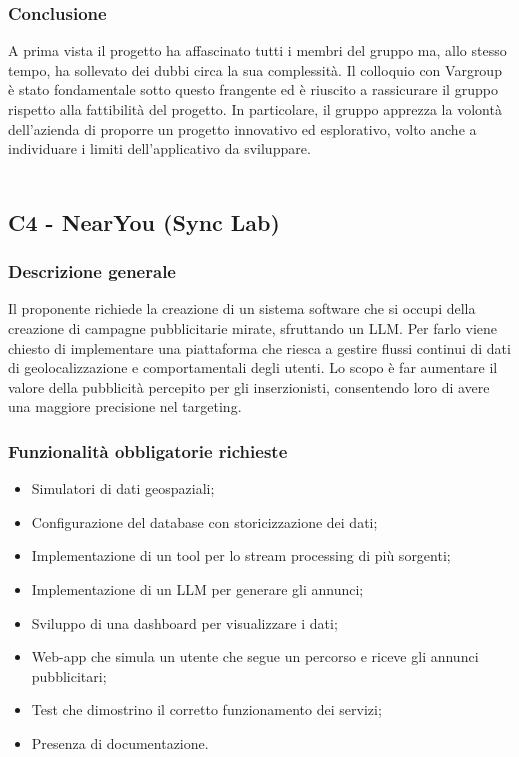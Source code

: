 \documentclass[10pt]{article}
\begin{document}
\subsubsection{Conclusione}
A prima vista il progetto ha affascinato tutti i membri del gruppo ma, allo stesso tempo, ha sollevato dei dubbi circa la sua complessità. Il colloquio con Vargroup è stato fondamentale sotto questo frangente ed è riuscito a rassicurare il gruppo rispetto alla fattibilità del progetto. In particolare, il gruppo apprezza la volontà dell’azienda di proporre un progetto innovativo ed esplorativo, volto anche a individuare i limiti dell’applicativo da sviluppare.
\\\\
\subsection{C4 - NearYou (Sync Lab)}
\subsubsection{Descrizione generale}
Il proponente richiede la creazione di un sistema software che si occupi della creazione di campagne pubblicitarie mirate, sfruttando un LLM. Per farlo viene chiesto di implementare una piattaforma che riesca a gestire flussi continui di dati di geolocalizzazione e comportamentali degli utenti. Lo scopo è far aumentare il valore della pubblicità percepito per gli inserzionisti, consentendo loro di avere una maggiore precisione nel targeting.
\subsubsection{Funzionalità obbligatorie richieste}
\begin{itemize}
    \item Simulatori di dati geospaziali;
    \item Configurazione del database con storicizzazione dei dati;
    \item Implementazione di un tool per lo stream processing di più sorgenti;
    \item Implementazione di un LLM per generare gli annunci;
    \item Sviluppo di una dashboard per visualizzare i dati;
    \item Web-app che simula un utente che segue un percorso e riceve gli annunci pubblicitari;
    \item Test che dimostrino il corretto funzionamento dei servizi;
    \item Presenza di documentazione.
\end{itemize}
\end{document}
